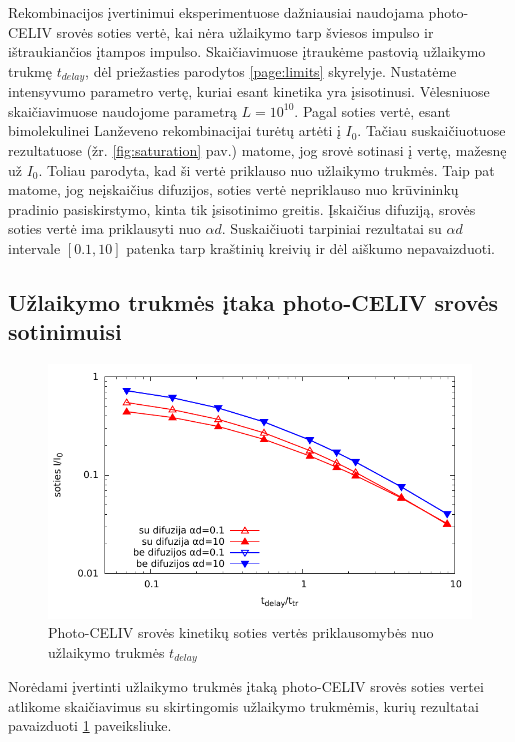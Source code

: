 Rekombinacijos įvertinimui eksperimentuose dažniausiai naudojama photo-CELIV srovės soties vertė, kai nėra užlaikymo tarp šviesos impulso ir ištraukiančios įtampos impulso. Skaičiavimuose įtraukėme pastovią užlaikymo trukmę $t_{delay}$, dėl priežasties parodytos \ref{page:limits} skyrelyje. Nustatėme intensyvumo parametro vertę, kuriai esant kinetika yra įsisotinusi. Vėlesniuose skaičiavimuose naudojome parametrą $L=10^{10}$. Pagal \cite{juška:155202} soties vertė, esant bimolekulinei Lanževeno rekombinacijai turėtų artėti į $I_0$. Tačiau suskaičiuotuose rezultatuose (žr. \ref{fig:saturation} pav.) matome, jog srovė sotinasi į vertę, mažesnę už $I_0$. Toliau parodyta, kad ši vertė priklauso nuo užlaikymo trukmės.
Taip pat matome, jog neįskaičius difuzijos, soties vertė nepriklauso nuo krūvininkų pradinio pasiskirstymo, kinta tik įsisotinimo greitis.
Įskaičius difuziją, srovės soties vertė ima priklausyti nuo $\alpha d$.
Suskaičiuoti tarpiniai rezultatai su $\alpha d$ intervale $[0.1 , 10]$ patenka tarp kraštinių kreivių ir dėl aiškumo nepavaizduoti.

\subsection{Užlaikymo trukmės įtaka photo-CELIV srovės sotinimuisi}

\begin{figure}[ht]
  \centering
	\includegraphics{./media/pdf/delays.pdf}
  \caption{Photo-CELIV srovės kinetikų soties vertės priklausomybės nuo užlaikymo trukmės $t_{delay}$}
  \label{fig:delays}
\end{figure}

Norėdami įvertinti užlaikymo trukmės įtaką photo-CELIV srovės soties vertei atlikome skaičiavimus su skirtingomis užlaikymo trukmėmis, kurių rezultatai pavaizduoti \ref{fig:delays} paveiksliuke.

